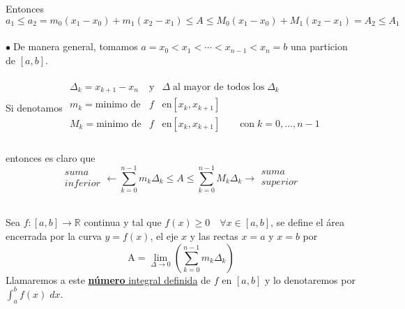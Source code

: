 \documentclass{article}
\theoremstyle{definition}
\theoremstyle{definition}
\theoremstyle{remark}
\newcommand\R{\ensuremath{\mathbb{R}}}
\newcommand\bl{$\bullet\;$}
\begin{document}
  \begin{figure}[h]
  \centering
  \def\svgwidth{0.55\textwidth}
  
  \end{figure}
  Entonces
  $$ a_1 \leq a_2 = m_0 (x_1-x_0)+m_1(x_2-x_1) \leq A \leq M_0 (x_1 - x_0) + M_1 (x_2 - x_1) = A_2 \leq A_1$$\\
\bl De manera general, tomamos $a=x_0 < x_1 < \cdots < x_{n-1}<x_n=b $ una particion de $[a,b]$. \\\\
Si denotamos $\begin{array}{lcl}
\Delta_k = x_{k+1}-x_n & \text{y} & \Delta \; \text{al mayor de todos los}\;  \Delta_k \\
m_k=\text{minimo de} & f & \text{en} [x_k,x_{k+1}] \\
M_k=\text{minimo de} & f & \text{en} [x_k,x_{k+1}] \quad \quad \text{con}\;  k=0, \dots , n-1\\
  \end{array}$\\\\
entonces es claro que
\[
\begin{array}{c}
  suma \\
  inferior
\end{array} \longleftarrow \sum_{k=0}^{n-1}{m_k\Delta_k}\leq A \leq \sum_{k=0}^{n-1}{M_k\Delta_k} \longrightarrow \begin{array}{c}
  suma \\
  superior
\end{array}
\]
\pagebreak
\begin{defi} \; \\
  Sea $f : [a,b] \to \R$ continua y tal que $f(x) \geq 0 \quad \forall x \in [a,b]$, se define el área encerrada por la curva $y=f(x)$, el eje $x$ y las rectas $x=a$ y $x=b$ por \[
\text{A} = \lim_{\Delta \to 0}\left( \sum_{k=0}^{n-1}{m_k\Delta_k}\right)
  \]
Llamaremos a este \underline{\textbf{número} integral definida} de $f$ en $[a,b]$ y lo denotaremos por $\int_{a}^{b}{f(x)\;dx}$.
\end{defi}
\end{document}
